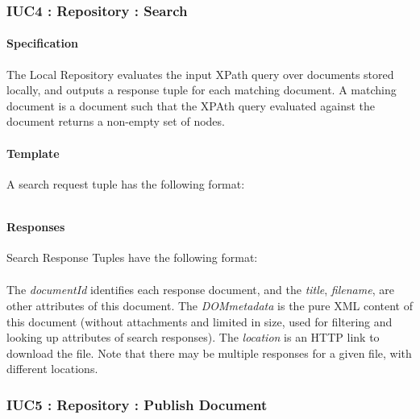 \documentclass[titlepage]{article}%
\begin{document}
\subsubsection{IUC4 : Repository : Search}
\label{iuc4}
\paragraph{Specification}
The Local Repository evaluates the input XPath query over documents stored locally, and outputs a response tuple for each matching document. 
A matching document is a document such that the XPAth query evaluated against the document returns a non-empty set of nodes.

\paragraph{Template}
A search request tuple has the following format:

\begin{equation*}
[\text{``SearchXpath"}; communityId; xPath; queryId]
\end{equation*}

\paragraph{Responses}
Search Response Tuples have the following format:
\begin{eqnarray*}
[\text{``SearchXpathAnswer"}; communityId; documentId; title; \\ filename; location; queryId; DOMmetadata]
\end{eqnarray*}

The \emph{documentId} identifies each response document, and the \emph{title}, \emph{filename}, are other attributes of this document. The \emph{DOMmetadata} is the pure XML content of this document (without attachments and limited in size, used for filtering and looking up attributes of search responses). The \emph{location} is an HTTP link to download the file. Note that there may be multiple responses for a given file, with different locations.


\subsubsection{IUC5 : Repository : Publish Document}
\label{iuc5}
\end{document}

